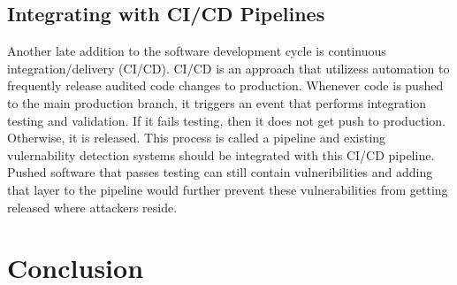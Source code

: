 \documentclass[12pt,twocolumn,letterpaper]{article}
\begin{document}
\subsection{Integrating with CI/CD Pipelines}
\label{sub:integrating-with-cicd-pipelines}

Another late addition to the software development cycle is continuous integration/delivery (CI/CD). 
CI/CD is an approach that utilizess automation to frequently release audited code changes to production. 
Whenever code is pushed to the main production branch, it triggers an event that performs integration 
testing and validation. If it fails testing, then it does not get push to production. Otherwise, it is 
released. This process is called a pipeline and existing vulernability detection systems should be integrated 
with this CI/CD pipeline. Pushed software that passes testing can still contain vulneribilities and adding 
that layer to the pipeline would further prevent these vulnerabilities from getting released where attackers 
reside.

\section{Conclusion}
\label{sec:conclusion}

{\small


}
\end{document}
